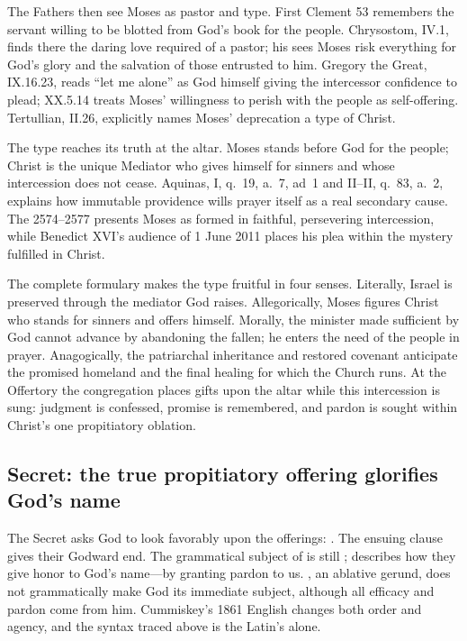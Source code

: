 The Fathers then see Moses as pastor and type. First Clement 53 remembers the
servant willing to be blotted from God's book for the people. Chrysostom,
 IV.1, finds there the daring love required of a
pastor; his  sees Moses risk everything for God's
glory and the salvation of those entrusted to him. Gregory the Great,
 IX.16.23, reads ``let me alone'' as God himself giving the
intercessor confidence to plead;  XX.5.14 treats Moses'
willingness to perish with the people as self-offering. Tertullian,
 II.26, explicitly names Moses' deprecation a type of
Christ.

The type reaches its truth at the altar. Moses stands before God for the
people; Christ is the unique Mediator who gives himself for sinners and whose
intercession does not cease. Aquinas,  I, q.~19, a.~7, ad~1 and
II--II, q.~83, a.~2, explains how immutable providence wills prayer itself as
a real secondary cause. The  2574--2577 presents Moses as
formed in faithful, persevering intercession, while Benedict XVI's audience of
1 June 2011 places his plea within the mystery fulfilled in Christ.

The complete formulary makes the type fruitful in four senses. Literally,
Israel is preserved through the mediator God raises. Allegorically, Moses
figures Christ who stands for sinners and offers himself. Morally, the minister
made sufficient by God cannot advance by abandoning the fallen; he enters the
need of the people in prayer. Anagogically, the patriarchal inheritance and
restored covenant anticipate the promised homeland and the final healing for
which the Church runs. At the Offertory the congregation places gifts upon the
altar while this intercession is sung: judgment is confessed, promise is
remembered, and pardon is sought within Christ's one propitiatory oblation.

\elementguard
\subsection*{Secret: the true propitiatory offering glorifies God's name }

The Secret asks God to look favorably upon the offerings:
. The ensuing
 clause gives their Godward end. The grammatical subject of
 is still ; 
describes how they give honor to God's name---by granting pardon to us.
, an ablative gerund, does not grammatically make God its
immediate subject, although all efficacy and pardon come from him. Cummiskey's 1861
English changes both order and agency, and the syntax traced above is the
Latin's alone.

